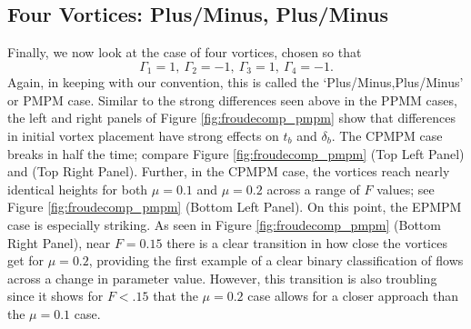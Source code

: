 \documentclass[a4paper,11pt]{article}
\begin{document}
\subsection{Four Vortices: Plus/Minus, Plus/Minus}
Finally, we now look at the case of four vortices, chosen so that
\[
\Gamma_{1}=1,~\Gamma_{2}=-1, ~ \Gamma_{3}=1,~\Gamma_{4}=-1.
\]
Again, in keeping with our convention, this is called the `Plus/Minus,Plus/Minus' or PMPM case.  Similar to the strong differences seen above in the PPMM cases, the left and right panels of Figure \ref{fig:froudecomp_pmpm} show that differences in initial vortex placement have strong effects on $t_{b}$ and $\delta_{b}$.  The CPMPM case breaks in half the time; compare Figure \ref{fig:froudecomp_pmpm} (Top Left Panel) and (Top Right Panel).  Further, in the CPMPM case, the vortices reach nearly identical heights for both $\mu=0.1$ and $\mu=0.2$ across a range of $F$ values; see Figure \ref{fig:froudecomp_pmpm} (Bottom Left Panel).  On this point, the EPMPM case is especially striking.  As seen in Figure \ref{fig:froudecomp_pmpm} (Bottom Right Panel), near $F=0.15$ there is a clear transition in how close the vortices get for $\mu=0.2$, providing the first example of a clear binary classification of flows across a change in parameter value.  However, this transition is also troubling since it shows for $F<.15$ that the $\mu=0.2$ case allows for a closer approach than the $\mu=0.1$ case.    
\end{document}
